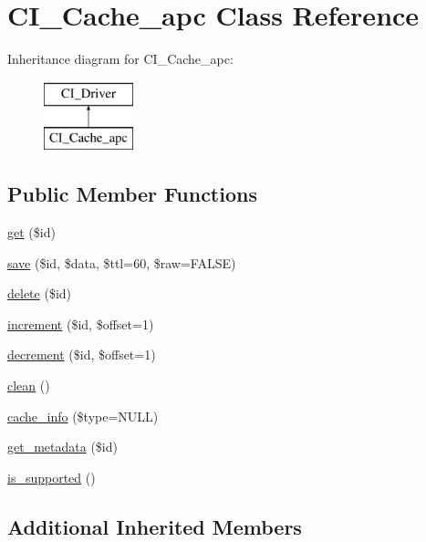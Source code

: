 \hypertarget{class_c_i___cache__apc}{}\section{C\+I\+\_\+\+Cache\+\_\+apc Class Reference}
\label{class_c_i___cache__apc}
Inheritance diagram for C\+I\+\_\+\+Cache\+\_\+apc\+:\begin{figure}[H]
\begin{center}
\leavevmode
\includegraphics[height=2.000000cm]{class_c_i___cache__apc}
\end{center}
\end{figure}
\subsection*{Public Member Functions}
\begin{DoxyCompactItemize}
\item 
\hyperlink{class_c_i___cache__apc_a50e3bfb586b2f42932a6a93f3fbb0828}{get} (\$id)
\item 
\hyperlink{class_c_i___cache__apc_a472645db04a8ce4b040b789a3062a7d2}{save} (\$id, \$data, \$ttl=60, \$raw=F\+A\+L\+S\+E)
\item 
\hyperlink{class_c_i___cache__apc_a2f8258add505482d7f00ea26493a5723}{delete} (\$id)
\item 
\hyperlink{class_c_i___cache__apc_a2f07a4e09b57f4460d49852497d1808f}{increment} (\$id, \$offset=1)
\item 
\hyperlink{class_c_i___cache__apc_a4eb1c2772c8efc48c411ea060dd040b7}{decrement} (\$id, \$offset=1)
\item 
\hyperlink{class_c_i___cache__apc_adb40b812890a8bc058bf6b7a0e1a54d9}{clean} ()
\item 
\hyperlink{class_c_i___cache__apc_aa8b9c4d9f0387156736ccd8850f0727e}{cache\+\_\+info} (\$type=N\+U\+L\+L)
\item 
\hyperlink{class_c_i___cache__apc_a59635cf18e997c5141bffa05ff7622e0}{get\+\_\+metadata} (\$id)
\item 
\hyperlink{class_c_i___cache__apc_a98c68fd153468bc148c4ed8c716859fc}{is\+\_\+supported} ()
\end{DoxyCompactItemize}
\subsection*{Additional Inherited Members}


